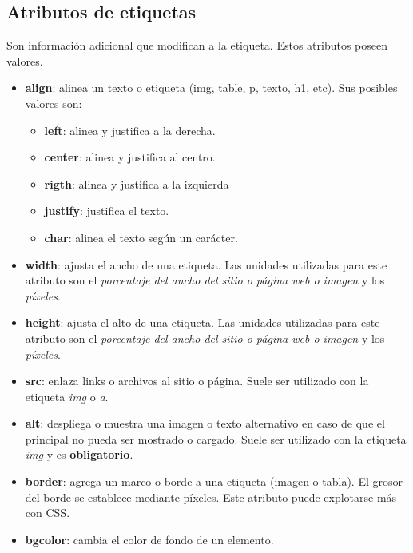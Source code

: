 \subsection{Atributos de etiquetas}
\hspace{0.55cm}Son información adicional que modifican a la etiqueta. Estos atributos poseen valores.
\begin{itemize}
    \item \textbf{align}: alinea un texto o etiqueta (img, table, p, texto, h1, etc). Sus posibles valores son:
    \begin{itemize}
        \item \textbf{left}: alinea y justifica a la derecha.
        \item \textbf{center}: alinea y justifica al centro.
        \item \textbf{rigth}: alinea y justifica a la izquierda
        \item \textbf{justify}: justifica el texto.
        \item \textbf{char}: alinea el texto según un carácter.
    \end{itemize}
    \item \textbf{width}: ajusta el ancho de una etiqueta. Las unidades utilizadas para este atributo son el \textit{porcentaje del ancho del sitio o página web o imagen} y los \textit{píxeles}.
    \item \textbf{height}: ajusta el alto de una etiqueta. Las unidades utilizadas para este atributo son el \textit{porcentaje del ancho del sitio o página web o imagen} y los \textit{píxeles}.
    \item \textbf{src}: enlaza links o archivos al sitio o página. Suele ser utilizado con la etiqueta \textit{img} o \textit{a}.
    \item \textbf{alt}: despliega o muestra una imagen o texto alternativo en caso de que el principal no pueda ser mostrado o cargado. Suele ser utilizado con la etiqueta \textit{img} y es \textbf{obligatorio}.
    \item \textbf{border}: agrega un marco o borde a una etiqueta (imagen o tabla). El grosor del borde se establece mediante píxeles. Este atributo puede explotarse más con CSS.
    \item \textbf{bgcolor}: cambia el color de fondo de un elemento.
\end{itemize}

